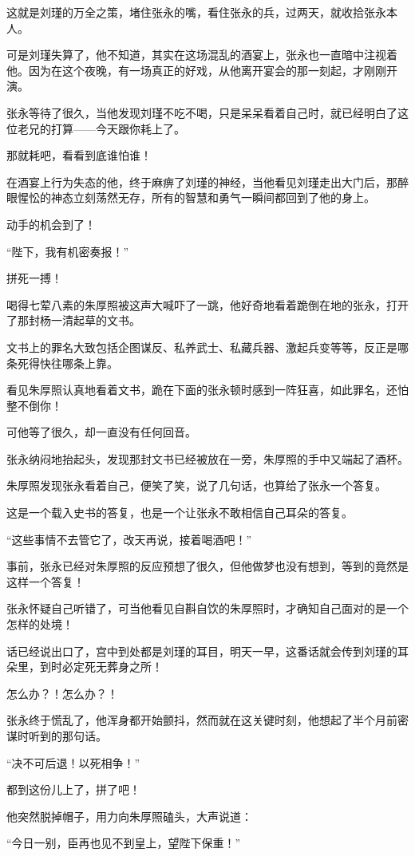 \begin{multicols}{\theparacolNo}
这就是刘瑾的万全之策，堵住张永的嘴，看住张永的兵，过两天，就收拾张永本人。

可是刘瑾失算了，他不知道，其实在这场混乱的酒宴上，张永也一直暗中注视着他。因为在这个夜晚，有一场真正的好戏，从他离开宴会的那一刻起，才刚刚开演。

张永等待了很久，当他发现刘瑾不吃不喝，只是呆呆看着自己时，就已经明白了这位老兄的打算——今天跟你耗上了。

那就耗吧，看看到底谁怕谁！

在酒宴上行为失态的他，终于麻痹了刘瑾的神经，当他看见刘瑾走出大门后，那醉眼惺忪的神态立刻荡然无存，所有的智慧和勇气一瞬间都回到了他的身上。

动手的机会到了！

“陛下，我有机密奏报！”

拼死一搏！

喝得七荤八素的朱厚照被这声大喊吓了一跳，他好奇地看着跪倒在地的张永，打开了那封杨一清起草的文书。

文书上的罪名大致包括企图谋反、私养武士、私藏兵器、激起兵变等等，反正是哪条死得快往哪条上靠。

看见朱厚照认真地看着文书，跪在下面的张永顿时感到一阵狂喜，如此罪名，还怕整不倒你！

可他等了很久，却一直没有任何回音。

张永纳闷地抬起头，发现那封文书已经被放在一旁，朱厚照的手中又端起了酒杯。

朱厚照发现张永看着自己，便笑了笑，说了几句话，也算给了张永一个答复。

这是一个载入史书的答复，也是一个让张永不敢相信自己耳朵的答复。

“这些事情不去管它了，改天再说，接着喝酒吧！”

事前，张永已经对朱厚照的反应预想了很久，但他做梦也没有想到，等到的竟然是这样一个答复！

张永怀疑自己听错了，可当他看见自斟自饮的朱厚照时，才确知自己面对的是一个怎样的处境！

话已经说出口了，宫中到处都是刘瑾的耳目，明天一早，这番话就会传到刘瑾的耳朵里，到时必定死无葬身之所！

怎么办？！怎么办？！

张永终于慌乱了，他浑身都开始颤抖，然而就在这关键时刻，他想起了半个月前密谋时听到的那句话。

“决不可后退！以死相争！”

都到这份儿上了，拼了吧！

他突然脱掉帽子，用力向朱厚照磕头，大声说道：

“今日一别，臣再也见不到皇上，望陛下保重！”


\end{multicols}

